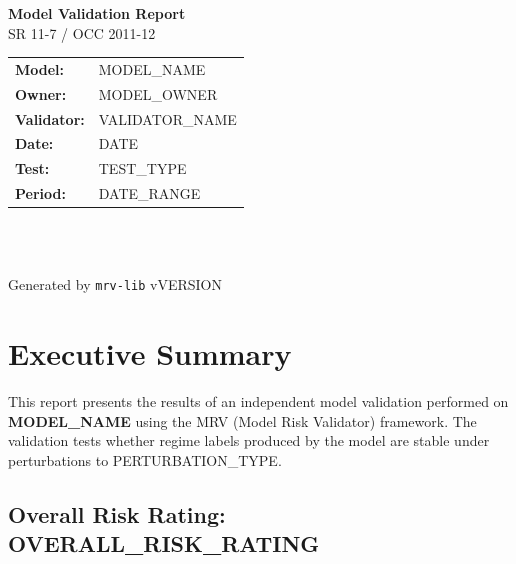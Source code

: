 \documentclass[11pt,a4paper]{article}
\begin{document}
\begin{titlepage}
\centering
\vspace*{3cm}
{\Huge\bfseries\textcolor{mrvblue}{Model Validation Report}\\[0.3cm]}
{\Large\textcolor{mrvgray}{SR 11-7 / OCC 2011-12}}\\[2cm]
{\large
\begin{tabular}{ll}
\textbf{Model:}     & {{MODEL_NAME}} \\
\textbf{Owner:}     & {{MODEL_OWNER}} \\
\textbf{Validator:} & {{VALIDATOR_NAME}} \\
\textbf{Date:}      & {{DATE}} \\
\textbf{Test:}      & {{TEST_TYPE}} \\
\textbf{Period:}    & {{DATE_RANGE}} \\
\end{tabular}
}\\[2cm]
\\[1cm]
{\footnotesize Generated by \texttt{mrv-lib} v{{VERSION}}}
\end{titlepage}

\tableofcontents
\newpage

\section{Executive Summary}

This report presents the results of an independent model validation performed
on \textbf{{{MODEL_NAME}}} using the MRV (Model Risk Validator) framework.
The validation tests whether regime labels produced by the model are stable
under perturbations to {{PERTURBATION_TYPE}}.

\subsection{Overall Risk Rating: {{OVERALL_RISK_RATING}}}
\end{document}
